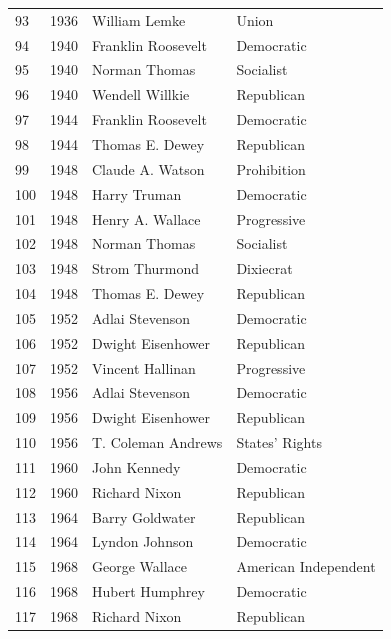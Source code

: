 \documentclass[
  letterpaper,
  DIV=11,
  numbers=noendperiod]{scrreprt}
\begin{document}
\begin{tabular}{lrll}
93  &  1936 &           William Lemke &                  Union \\
94  &  1940 &      Franklin Roosevelt &             Democratic \\
95  &  1940 &           Norman Thomas &              Socialist \\
96  &  1940 &         Wendell Willkie &             Republican \\
97  &  1944 &      Franklin Roosevelt &             Democratic \\
98  &  1944 &         Thomas E. Dewey &             Republican \\
99  &  1948 &        Claude A. Watson &            Prohibition \\
100 &  1948 &            Harry Truman &             Democratic \\
101 &  1948 &        Henry A. Wallace &            Progressive \\
102 &  1948 &           Norman Thomas &              Socialist \\
103 &  1948 &          Strom Thurmond &              Dixiecrat \\
104 &  1948 &         Thomas E. Dewey &             Republican \\
105 &  1952 &         Adlai Stevenson &             Democratic \\
106 &  1952 &       Dwight Eisenhower &             Republican \\
107 &  1952 &        Vincent Hallinan &            Progressive \\
108 &  1956 &         Adlai Stevenson &             Democratic \\
109 &  1956 &       Dwight Eisenhower &             Republican \\
110 &  1956 &      T. Coleman Andrews &         States' Rights \\
111 &  1960 &            John Kennedy &             Democratic \\
112 &  1960 &           Richard Nixon &             Republican \\
113 &  1964 &         Barry Goldwater &             Republican \\
114 &  1964 &          Lyndon Johnson &             Democratic \\
115 &  1968 &          George Wallace &   American Independent \\
116 &  1968 &         Hubert Humphrey &             Democratic \\
117 &  1968 &           Richard Nixon &             Republican \\

\end{tabular}
\end{document}

